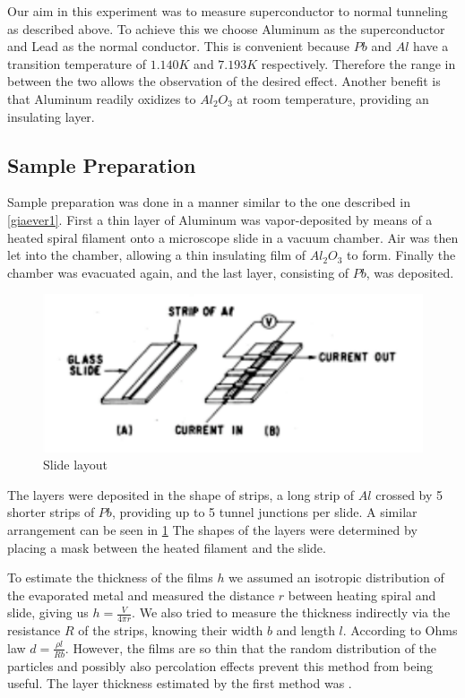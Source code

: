 
Our aim in this experiment was to measure superconductor to normal tunneling as described above. To achieve this we choose Aluminum as the superconductor and Lead as the normal conductor. This is convenient because $Pb$ and $Al$ have a transition temperature of $1.140 K$ and $7.193 K$ respectively. Therefore the range in between the two allows the observation of the desired effect. Another benefit is that Aluminum readily oxidizes to $Al_2O_3$ at room temperature, providing an insulating layer.

\subsection{Sample Preparation}
Sample preparation was done in a manner similar to the one described in \ref{giaever1}. First a thin layer of Aluminum was vapor-deposited by means of a heated spiral filament onto a microscope slide in a vacuum chamber. Air was then let into the chamber, allowing a thin insulating film of $Al_2O_3$ to form. Finally the chamber was evacuated again, and the last layer, consisting of $Pb$, was deposited.

\begin{figure}
\centering
\includegraphics[scale=1]{sample.pdf}
\caption{Slide layout\label{sample}}
\end{figure}

The layers were deposited in the shape of strips, a long strip of $Al$ crossed by 5 shorter strips of $Pb$, providing up to 5 tunnel junctions per slide. A similar arrangement can be seen in \ref{sample} The shapes of the layers were determined by placing a mask between the heated filament and the slide.

To estimate the thickness of the films $h$ we assumed an isotropic distribution of the evaporated metal and measured the distance $r$ between heating spiral and slide, giving us $h=\frac{V}{4\pi r}$. We also tried to measure the thickness indirectly via the resistance $R$ of the strips, knowing their width $b$ and length $l$. According to Ohms law $d=\frac{\rho l}{Rb}$. However, the films are so thin that the random distribution of the particles and possibly also percolation effects prevent this method from being useful. The layer thickness estimated by the first method was .

